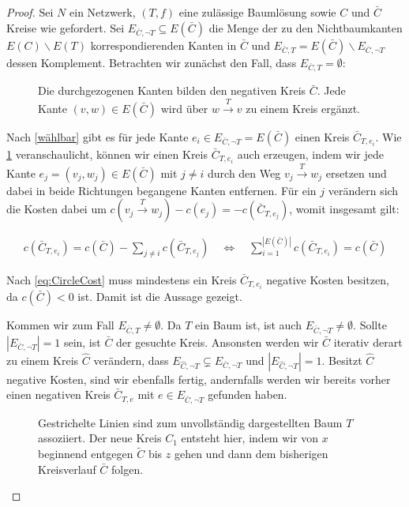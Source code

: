 \begin{proof}Sei $N$ ein Netzwerk, $(T,f)$ eine zulässige Baumlösung sowie $C$ und $\bar{C}$ Kreise wie gefordert. Sei $E_{\bar{C},\neg T}\subseteq E(\bar{C})$ die Menge der zu den Nichtbaumkanten $E(C)\backslash E(T)$ korrespondierenden Kanten in $\bar{C}$ und $E_{\bar{C},T}=E(\bar{C})\backslash E_{\bar{C},\neg T}$ dessen Komplement. Betrachten wir zunächst den Fall, dass $E_{\bar{C},T}=\emptyset$:

\begin{figure}[!ht]\centering
	
	\caption{Die durchgezogenen Kanten bilden den negativen Kreis $\bar{C}$. Jede Kante $(v,w)\in E(\bar{C})$ wird über $w\xrightarrow{T}v$ zu einem Kreis ergänzt.}
	\label{fig:NTC}
\end{figure}

Nach \cref{wählbar} gibt es für jede Kante $e_i\in E_{\bar{C},\neg T}=E(\bar{C})$ einen Kreis $\bar{C}_{T,e_i}$. Wie \cref{fig:NTC} veranschaulicht, können wir einen Kreis $\bar{C}_{T,e_i}$ auch erzeugen, indem wir jede Kante $e_j=(v_j,w_j)\in E(\bar{C})$ mit $j\neq i$ durch den Weg $v_j\xrightarrow{T}w_j$ ersetzen und dabei in beide Richtungen begangene Kanten entfernen. Für ein $j$ verändern sich die Kosten dabei um $c(v_j\xrightarrow{T}w_j)-c(e_j)=-c(\bar{C}_{T,e_j})$, womit insgesamt gilt:

\begin{align}
c(\bar{C}_{T,e_i})=c(\bar{C})-\sum_{j\neq i} c(\bar{C}_{T,e_j})
\quad\Leftrightarrow\quad\sum_{i=1}^{|E(\bar{C})|} c(\bar{C}_{T,e_i})=c(\bar{C})\label{eq:CircleCost}
\end{align}

Nach \cref{eq:CircleCost} muss mindestens ein Kreis $\bar{C}_{T,e_i}$ negative Kosten besitzen, da $c(\bar{C})<0$ ist. Damit ist die Aussage gezeigt.

Kommen wir zum Fall $E_{\bar{C},T}\neq\emptyset$. Da $T$ ein Baum ist, ist auch $E_{\bar{C},\neg T}\neq\emptyset$. Sollte $|E_{\bar{C},\neg T}|=1$ sein, ist $\bar{C}$ der gesuchte Kreis. Ansonsten werden wir $\bar{C}$ iterativ derart zu einem Kreis $\hat{C}$ verändern, dass $E_{\hat{C},\neg T}\subsetneq E_{\bar{C},\neg T}$ und $|E_{\hat{C},\neg T}|=1$. Besitzt $\hat{C}$ negative Kosten, sind wir ebenfalls fertig, andernfalls werden wir bereits vorher einen negativen Kreis $\bar{C}_{T,e}$ mit $e\in E_{\bar{C},\neg T}$ gefunden haben.

\begin{figure}[!ht]\centering
	
	\caption{Gestrichelte Linien sind zum unvollständig dargestellten Baum $T$ assoziiert. Der neue Kreis $C_1$ entsteht hier, indem wir von $x$ beginnend entgegen $\tilde{C}$ bis $z$ gehen und dann dem bisherigen Kreisverlauf $\bar{C}$ folgen.}
	\label{fig:TC}
\end{figure}


\end{proof}
